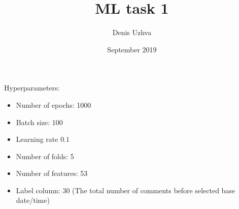 \documentclass{article}
\begin{document}
\title{ML task 1}
\author{Denis Uzhva}
\date{September 2019}
\maketitle

Hyperparameters:
\begin{itemize}
    \item Number of epochs: 1000
    \item Batch size: 100
    \item Learning rate $0.1$
    \item Number of folds: 5
    \item Number of features: 53
    \item Label column: 30 (The total number of comments before selected base date/time)
\end{itemize}
\end{document}
